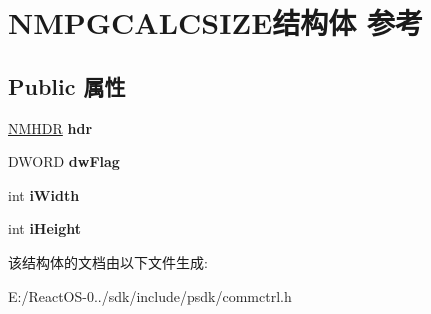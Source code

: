 \hypertarget{struct_n_m_p_g_c_a_l_c_s_i_z_e}{}\section{N\+M\+P\+G\+C\+A\+L\+C\+S\+I\+Z\+E结构体 参考}
\label{struct_n_m_p_g_c_a_l_c_s_i_z_e}
\subsection*{Public 属性}
\begin{DoxyCompactItemize}
\item 
\mbox{\label{struct_n_m_p_g_c_a_l_c_s_i_z_e_a6aa870b35f3cb721a51c2a359d19b59e}} 
\hyperlink{structtag_n_m_h_d_r}{N\+M\+H\+DR} {\bfseries hdr}
\item 
\mbox{\label{struct_n_m_p_g_c_a_l_c_s_i_z_e_abee53bc6c39b69459212dbfcd4e1dad7}} 
D\+W\+O\+RD {\bfseries dw\+Flag}
\item 
\mbox{\label{struct_n_m_p_g_c_a_l_c_s_i_z_e_acba0c3eb3aa5ede73f78cfd2cdffe1f8}} 
int {\bfseries i\+Width}
\item 
\mbox{\label{struct_n_m_p_g_c_a_l_c_s_i_z_e_aad18d5d5a10cf26c091e79ee740ed747}} 
int {\bfseries i\+Height}
\end{DoxyCompactItemize}


该结构体的文档由以下文件生成\+:\begin{DoxyCompactItemize}
\item 
E\+:/\+React\+O\+S-\/0../sdk/include/psdk/commctrl.\+h\end{DoxyCompactItemize}
